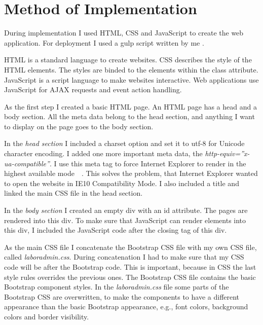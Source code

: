 \section{Method of Implementation}

During implementation I used HTML, CSS and JavaScript to create the web application. For deployment I used a gulp script written by me . 

HTML is a standard language to create websites. CSS describes the style of the HTML elements. The styles are binded to the elements within the class attribute. JavaScript is a script language to make websites interactive. Web applications use JavaScript for AJAX requests and event action handling. 

As the first step I created a basic HTML page. An HTML page has a head and a body section. All the meta data belong to the head section, and anything I want to display on the page goes to the body section. \label{html-impl}

In the \emph{head section} I included a charset option and set it to utf-8 for Unicode character encoding. I added one more important meta data, the \emph{http-equiv=''x-ua-compatible''}. I use this meta tag to force Internet Explorer to render in the highest available mode~\cite{IE10-microsoft}~\cite{IE10-html5-boiler}. This solves the problem, that Internet Explorer wanted to open the website in IE10 Compatibility Mode. I also included a title and linked the main CSS file in the head section.

In the \emph{body section} I created an empty div with an id attribute. The pages are rendered into this div. To make sure that JavaScript can render elements into this div, I included the JavaScript code after the closing tag of this div.

As the main CSS file I concatenate the Bootstrap CSS file with my own CSS file, called \mbox{\emph{laboradmin.css}}. During concatenation I had to make sure that my CSS code will be after the Bootstrap code. This is important, because in CSS the last style rules overrides the previous ones. The Bootstrap CSS file contains the basic Bootstrap component styles. In the \mbox{\emph{laboradmin.css}} file some parts of the Bootstrap CSS are overwritten, to make the components to have a different appearance than the basic Bootstrap appearance, e.g., font colors, background colors and border visibility.


